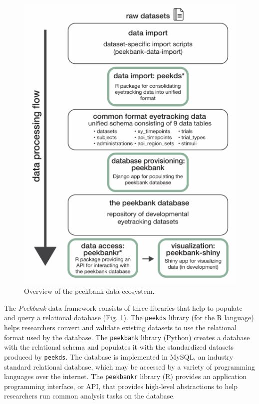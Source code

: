 \documentclass[10pt, letterpaper]{article}
\newenvironment{CodeChunk}{}{}
\begin{document}
\begin{CodeChunk}
\begin{figure}[tb]

{\centering \includegraphics{figs/fig_framework_overview-1} 

}

\caption[Overview of the peekbank data ecosystem]{Overview of the peekbank data ecosystem.}\label{fig:fig_framework_overview}
\end{figure}
\end{CodeChunk}

The \emph{Peekbank} data framework consists of three libraries that help
to populate and query a relational database (Fig.
\ref{fig:fig_framework_overview}). The \texttt{peekds} library (for the
R language) helps researchers convert and validate existing datasets to
use the relational format used by the database. The \texttt{peekbank}
library (Python) creates a database with the relational schema and
populates it with the standardized datasets produced by \texttt{peekds}.
The database is implemented in MySQL, an industry standard relational
database, which may be accessed by a variety of programming languages
over the internet. The \texttt{peekbankr} library (R) provides an
application programming interface, or API, that provides high-level
abstractions to help researchers run common analysis tasks on the
database.
\end{document}
